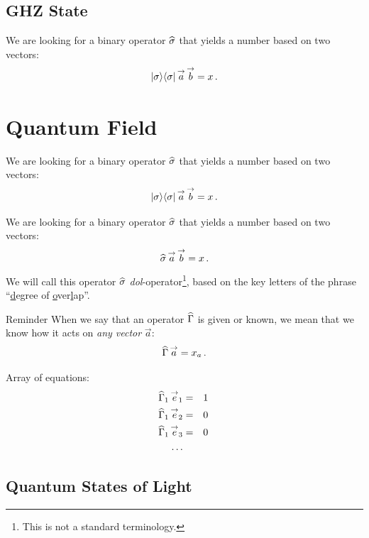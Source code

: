 \subsection{GHZ State}\label{sec:GHZState}
We are looking for a binary operator $\widehat{\sigma}$ that yields a number
based on two vectors:
\[
|{\sigma}\rangle\langle{\sigma}|\,\overset{\rightarrow}{a}\,\overset{\rightarrow}{b}=x\,.
\]


\section{Quantum Field}\label{sec:QuantumField}
We are looking for a binary operator $\widehat{\sigma}$ that yields a number
based on two vectors:
\[
|{\sigma}\rangle\langle{\sigma}|\,\overset{\rightarrow}{a}\,\overset{\rightarrow}{b}=x\,.
\]

We are looking for a binary operator $\widehat{\sigma}$ that yields a number
based on two vectors:
\[
\widehat{\sigma}\,\overset{\rightarrow}{a}\,\overset{\rightarrow}{b}=x\,.
\]
We will call this operator $\widehat{\sigma}$ \emph{dol}-operator\footnote{This is not a
standard terminology. }, based on the key letters of the phrase
``\underline{d}egree of \underline{o}ver\underline{l}ap''.

\begin{myrem}{Reminder}
When we say that an operator $\widehat{\Gamma}$ is given or known, we
mean that we know how it acts on \emph{any vector} $\vec{a}$:
\[
\widehat{\Gamma}\,\overset{\rightarrow}{a} = x_a\,.
\]
\end{myrem}

Array of equations:
\begin{eqnarray}
  \widehat{\Gamma}_1\,\overset{\rightarrow}{e}_1 & = & 1\,\\
  \widehat{\Gamma}_1\,\overset{\rightarrow}{e}_2 & = & 0\,\\
  \widehat{\Gamma}_1\,\overset{\rightarrow}{e}_3 & = & 0\,\\
  \ldots
\end{eqnarray}

\subsection{Quantum States of Light}

